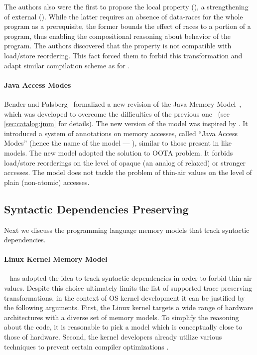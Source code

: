 The authors also were the first to propose the local \DRF property (\lDRF),
a strengthening of external \DRF (\eDRF). 
While the latter requires an absence of data-races 
for the whole program as a prerequisite, 
the former bounds the effect of races 
to a portion of a program, thus 
enabling the compositional reasoning 
about behavior of the program. 
The authors discovered that the \lDRF property 
is not compatible with load/store reordering.
This fact forced them to forbid this transformation
and adapt similar compilation scheme as for \RCMM. 

\paragraph{Java Access Modes}

Bender and Palsberg~\cite{Bender-Palsberg:OOPSLA19} formalized a new revision 
of the Java Memory Model~\cite{JDK9-VarHandle, JEP:193, JDK9-Modes}, 
which was developed to overcome 
the difficulties of the previous one~\cite{Manson-al:POPL05}
(see \ref{sec:catalog:jmm} for details).
The new version of the model was inspired by \RCMM. 
It introduced a system of annotations on memory accesses, 
called ``Java Access Modes'' (hence the name of the model --- \JAM),
similar to those present in \CMM like models.
The new model adopted the \RCMM solution to OOTA problem. 
It forbids load/store reorderings on the level of 
opaque (an analog of \CPP relaxed) or stronger accesses.
The model does not tackle the problem of 
thin-air values on the level of plain (\ie non-atomic) accesses.

\subsection{Syntactic Dependencies Preserving}
\label{sec:catalog:deprf}

Next we discuss the programming language memory models 
that track syntactic dependencies.

\paragraph{Linux Kernel Memory Model}

\LKMM~\cite{Alglave-al:ASPLOS18} has adopted 
the idea to track syntactic dependencies in order to 
forbid thin-air values. Despite this choice 
ultimately limits the list of supported 
trace preserving transformations,
in the context of OS kernel development 
it can be justified by the following arguments. 
First, the Linux kernel targets 
a wide range of hardware architectures with a diverse
set of memory models. To simplify the reasoning about the code, 
it is reasonable to pick a model which is conceptually close
to those of hardware. 
Second, the kernel developers already utilize 
various techniques to prevent certain compiler optimizations%
\cite{Alglave-al:ASPLOS18, LK-MemBarriers, LK-RCU-Deref}.

